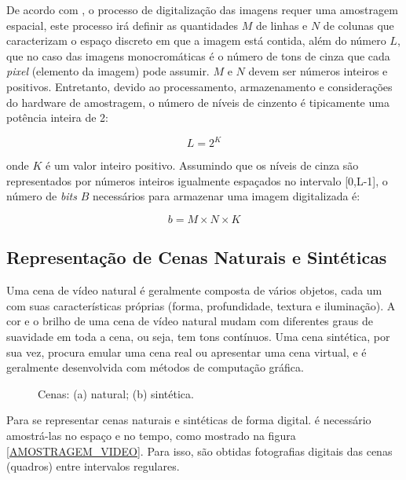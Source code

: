 	De acordo com , o processo de digitalização das imagens requer uma amostragem espacial, este processo irá definir as quantidades $M$ de linhas e $N$ de colunas que caracterizam o espaço discreto em que a imagem está contida, além do número $L$, que no caso das imagens monocromáticas é o número de tons de cinza que cada \textit{pixel} (elemento da imagem) pode assumir. $M$ e $N$ devem ser números inteiros e positivos. Entretanto, devido ao processamento, armazenamento e considerações do hardware de amostragem, o número de níveis de cinzento é tipicamente uma potência inteira de 2:
\vspace{-1cm}
\begin{center}
	\begin{equation}
		L = 2^K
	\end{equation}
\end{center}	 
\noindent onde $K$ é um valor inteiro positivo. Assumindo que os níveis de cinza são representados por números inteiros igualmente espaçados no intervalo [0,L-1], o número de \textit{bits} $B$ necessários para armazenar uma imagem digitalizada é:

\begin{equation}
	b = M \times N \times K
\end{equation}

\subsection{Representação de Cenas Naturais e Sintéticas}

Uma cena de vídeo natural é geralmente composta de vários objetos, cada um com suas características próprias (forma, profundidade, textura e iluminação). A cor e o brilho de uma cena de vídeo natural mudam com diferentes graus de suavidade em toda a cena, ou seja, tem tons contínuos. Uma cena sintética, por sua vez, procura emular uma cena real ou apresentar uma cena virtual, e é geralmente desenvolvida com métodos de computação gráfica.\cite{scharstein2002taxonomy}

\begin{figure}[h]
    \centering
    \qquad
    \caption{Cenas: (a) natural; (b) sintética.}%
	    
    \label{fig:RGB}%
\end{figure}
Para se representar cenas naturais e sintéticas de forma digital. é necessário amostrá-las no espaço e no tempo, como mostrado na figura \ref{AMOSTRAGEM_VIDEO}. Para isso, são obtidas fotografias digitais das cenas (quadros) entre intervalos regulares.
\cite{garcia2013tecnicas}


